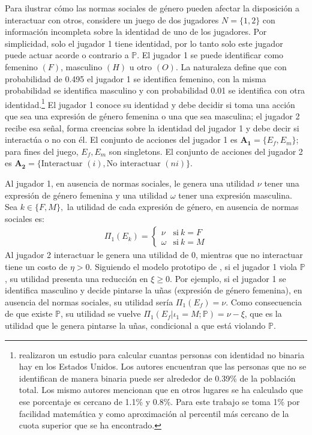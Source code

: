 Para ilustrar cómo las normas sociales de género pueden afectar la disposición a interactuar con otros, considere un juego de dos jugadores $N=\{1,2\}$ con información incompleta sobre la identidad de uno de los jugadores. Por simplicidad, solo el jugador 1 tiene identidad, por lo tanto solo este jugador puede actuar acorde o contrario a $\mathbb{P}$. El jugador 1 se puede identificar como femenino $(F)$, masculino $(H)$ u otro $(O)$. La naturaleza define que con probabilidad de 0.495 el jugador 1 se identifica femenino, con la misma probabilidad se identifica masculino y con probabilidad 0.01 se identifica con otra identidad.\footnote{\cite{meerwijk2017transgender} realizaron un estudio para calcular cuantas personas con identidad no binaria hay en los Estados Unidos. Los autores encuentran que las personas que no se identifican de manera binaria puede ser alrededor de 0.39\% de la población total. Los mismo autores mencionan que en otros lugares se ha calculado que ese porcentaje es cercano de 1.1\% y 0.8\%. Para este trabajo se toma 1\% por facilidad matemática y como aproximación al percentil más cercano de la cuota superior que se ha encontrado.} 
El jugador 1 conoce su identidad y debe decidir si toma una acción que sea una expresión de género femenina o una que sea masculina; el jugador 2 recibe esa señal, forma creencias sobre la identidad del jugador 1 y debe decir si interactúa o no con él. El conjunto de acciones del jugador 1 es $\mathbf{A_1}=\{E_f, E_m \}$; para fines del juego,  $E_f, E_m$ son singletons. El conjunto de acciones del jugador 2 es $\mathbf{A_2}=\{\text{Interactuar } (i), \text{No interactuar }(ni)\}$.

Al jugador 1, en ausencia de normas sociales, le genera una utilidad $\nu$ tener una expresión de género femenina y una utilidad $\omega$ tener una expresión masculina. Sea $k \in \{F,M\},$ la utilidad de cada expresión de género, en ausencia de normas sociales es: 
\begin{align*}
 \Pi_1(E_k)=   
\begin{cases}
    \nu & \text{si} \ k=F \\
    \omega & \text{si} \ k=M
\end{cases}
\end{align*}
Al jugador 2 interactuar le genera una utilidad de $0$, mientras que no interactuar tiene un costo de $\eta>0$. Siguiendo el modelo prototipo de \cite{akerlof2000economics}, si el jugador 1 viola $\mathbb{P}$, su utilidad presenta una reducción en $\xi\geq0$.  Por ejemplo, si el jugador 1 se identifica masculino y decide pintarse la uñas (expresión de género femenina), en ausencia del normas sociales, su utilidad sería $\Pi_1(E_f)=\nu$.  Como consecuencia de que existe $\mathbb{P}$, su utilidad se vuelve  $\Pi_1(E_f|\iota_1=M; \mathbb{P})=\nu-\xi$, que es la utilidad que le genera pintarse la uñas, condicional a que está violando $\mathbb{P}$.

